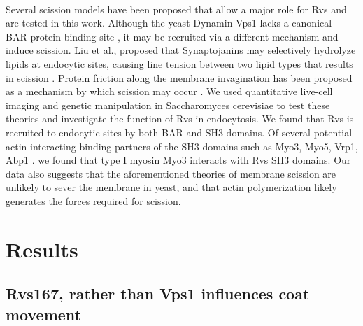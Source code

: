 \documentclass[9pt,lineno]{elife}
\begin{document}
~\\
Several scission models have been proposed that allow a major role for Rvs and are tested in this work. Although the yeast Dynamin Vps1 lacks a canonical BAR-protein binding site \citep{Bui2012,Moustaq2016}, it may be recruited via a different mechanism and induce scission. Liu et al., proposed that Synaptojanins may selectively hydrolyze lipids at endocytic sites, causing line tension between two lipid types that results in scission \citep{Liu2009}. Protein friction along the membrane invagination has been proposed as a mechanism by which scission may occur \citep{Simunovic2017b}. We used quantitative live-cell imaging and genetic manipulation in Saccharomyces cerevisiae to test these theories and investigate the function of Rvs in endocytosis. We found that Rvs is recruited to endocytic sites by both BAR and SH3 domains. Of several potential actin-interacting binding partners of the SH3 domains such as Myo3, Myo5, Vrp1, Abp1 \citep{Lila1997,Colwill1999,Madania1999,Liu2009}. we found that type I myosin Myo3 interacts with Rvs SH3 domains. Our data also suggests that the aforementioned theories of membrane scission are unlikely to sever the membrane in yeast, and that actin polymerization likely generates the forces required for scission. 



\section{Results}

\subsection{Rvs167, rather than Vps1 influences coat movement}
\end{document}
